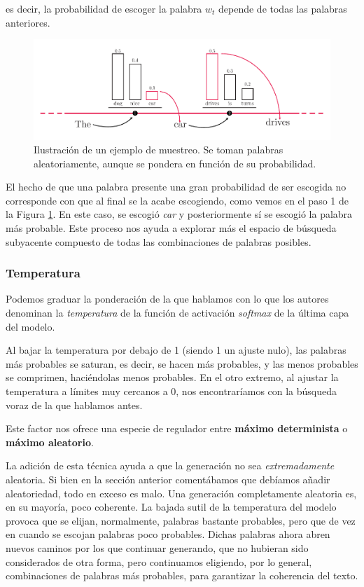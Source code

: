 es decir, la probabilidad de escoger la palabra $w_t$ depende de todas las palabras anteriores.

\begin{figure}[h]
	\centering
	\includegraphics[width=.9\textwidth]{media/sampling.pdf}
	\caption{Ilustración de un ejemplo de muestreo. Se toman palabras aleatoriamente, aunque se pondera en función de su probabilidad.}
	\label{fig:sampling}
\end{figure}

El hecho de que una palabra presente una gran probabilidad de ser escogida no corresponde con que al final se la acabe escogiendo, como vemos en el paso 1 de la Figura \ref{fig:sampling}. En este caso, se escogió \textit{car} y posteriormente sí se escogió la palabra más probable. Este proceso nos ayuda a explorar más el espacio de búsqueda subyacente compuesto de todas las combinaciones de palabras posibles.

\subsubsection{Temperatura}
Podemos graduar la ponderación de la que hablamos con lo que los autores denominan la \textit{temperatura} de la función de activación \textit{softmax} de la última capa del modelo.

Al bajar la temperatura por debajo de 1 (siendo 1 un ajuste nulo), las palabras más probables se saturan, es decir, se hacen más probables, y las menos probables se comprimen, haciéndolas menos probables. En el otro extremo, al ajustar la temperatura a límites muy cercanos a 0, nos encontraríamos con la búsqueda voraz de la que hablamos antes.

Este factor nos ofrece una especie de regulador entre \textbf{máximo determinista} o \textbf{máximo aleatorio}.

La adición de esta técnica ayuda a que la generación no sea \textit{extremadamente} aleatoria. Si bien en la sección anterior comentábamos que debíamos añadir aleatoriedad, todo en exceso es malo. Una generación completamente aleatoria es, en su mayoría, poco coherente. La bajada sutil de la temperatura del modelo provoca que se elijan, normalmente, palabras bastante probables, pero que de vez en cuando se escojan palabras poco probables. Dichas palabras ahora abren nuevos caminos por los que continuar generando, que no hubieran sido considerados de otra forma, pero continuamos eligiendo, por lo general, combinaciones de palabras más probables, para garantizar la coherencia del texto.


